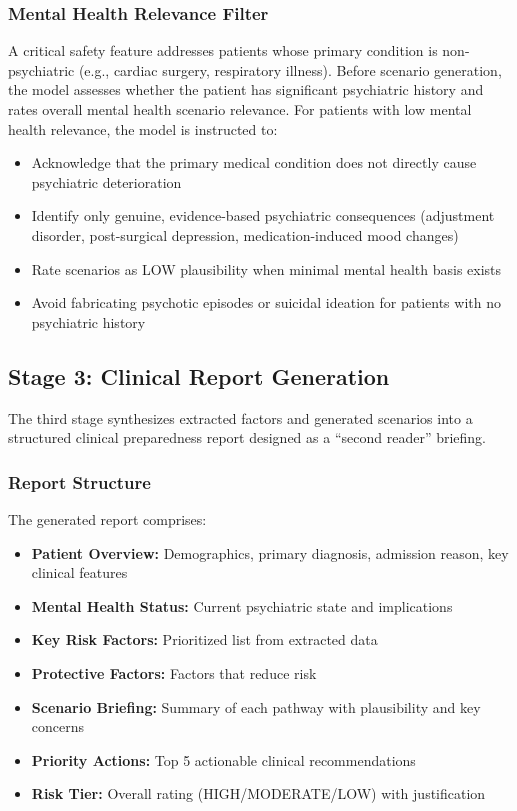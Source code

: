 \documentclass[conference]{IEEEtran}
\begin{document}
\subsubsection{Mental Health Relevance Filter}
A critical safety feature addresses patients whose primary condition is non-psychiatric (e.g., cardiac surgery, respiratory illness). Before scenario generation, the model assesses whether the patient has significant psychiatric history and rates overall mental health scenario relevance. For patients with low mental health relevance, the model is instructed to:
\begin{itemize}
\item Acknowledge that the primary medical condition does not directly cause psychiatric deterioration
\item Identify only genuine, evidence-based psychiatric consequences (adjustment disorder, post-surgical depression, medication-induced mood changes)
\item Rate scenarios as LOW plausibility when minimal mental health basis exists
\item Avoid fabricating psychotic episodes or suicidal ideation for patients with no psychiatric history
\end{itemize}

\subsection{Stage 3: Clinical Report Generation}

The third stage synthesizes extracted factors and generated scenarios into a structured clinical preparedness report designed as a ``second reader'' briefing.

\subsubsection{Report Structure}
The generated report comprises:
\begin{itemize}
\item \textbf{Patient Overview:} Demographics, primary diagnosis, admission reason, key clinical features
\item \textbf{Mental Health Status:} Current psychiatric state and implications
\item \textbf{Key Risk Factors:} Prioritized list from extracted data
\item \textbf{Protective Factors:} Factors that reduce risk
\item \textbf{Scenario Briefing:} Summary of each pathway with plausibility and key concerns
\item \textbf{Priority Actions:} Top 5 actionable clinical recommendations
\item \textbf{Risk Tier:} Overall rating (HIGH/MODERATE/LOW) with justification
\end{itemize}
\end{document}
